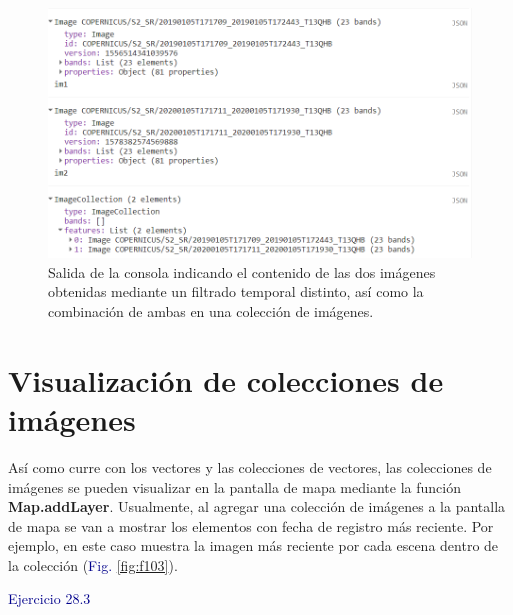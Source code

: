 \documentclass[
  12pt,
  letterpaper,
  twoside]{book}
\newcommand\boldpurple[1]{\textcolor{darkpurple}{\textbf{#1}}}
\begin{document}
\begin{figure}[H]

{\centering \includegraphics[width=0.8\linewidth]{Img/imcolnew} 

}

\caption{Salida de la consola indicando el contenido de las dos imágenes obtenidas mediante un filtrado temporal distinto, así como la combinación de ambas en una colección de imágenes.}\label{fig:f102}
\end{figure}

\hypertarget{visualizaciuxf3n-de-colecciones-de-imuxe1genes}{%
\section{Visualización de colecciones de imágenes}\label{visualizaciuxf3n-de-colecciones-de-imuxe1genes}}

Así como curre con los vectores y las colecciones de vectores, las colecciones de imágenes se pueden visualizar en la pantalla de mapa mediante la función \boldpurple{Map.addLayer}. Usualmente, al agregar una colección de imágenes a la pantalla de mapa se van a mostrar los elementos con fecha de registro más reciente. Por ejemplo, en este caso muestra la imagen más reciente por cada escena dentro de la colección (\textcolor{darkblue}{Fig.} \ref{fig:f103}).

\textcolor{darkblue}{Ejercicio 28.3}
\end{document}
